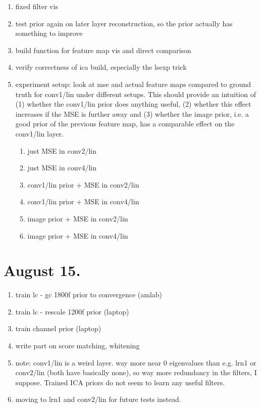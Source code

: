 \documentclass{article}
\begin{document}
\begin{enumerate}
	\item fixed filter vis
	\item test prior again on later layer reconstruction, so the prior actually has something to improve
	\item build function for feature map vis and direct comparison
	\item verify correctness of ica build, especially the lsexp trick
	\item experiment setup: look at mse and actual feature maps compared to ground truth for conv1/lin under different setups.
	This should provide an intuition of (1) whether the conv1/lin prior does anything useful, (2) whether this effect increases if the MSE is further away and (3) whether the image prior, i.e. a good prior of the previous feature map, has a comparable effect on the conv1/lin layer.
	\begin{enumerate}
		\item just MSE in conv2/lin
		\item just MSE in conv4/lin
		\item conv1/lin prior + MSE in conv2/lin
		\item conv1/lin prior + MSE in conv4/lin
		\item image prior + MSE in conv2/lin
		\item image prior + MSE in conv4/lin		
	\end{enumerate}
	
\end{enumerate}


\section{August 15.}

\begin{enumerate}
	\item train lc - gc 1800f prior to convergence (amlab)
	\item train lc - rescale 1200f prior (laptop)
	\item train channel prior (laptop)
	\item write part on score matching, whitening
	\item note: conv1/lin is a weird layer. way more near 0 eigenvalues than e.g. lrn1 or conv2/lin (both have basically none), so way more redundancy in the filters, I suppose. Trained ICA priors do not seem to learn any useful filters.
	\item moving to lrn1 and conv2/lin for future tests instead.
\end{enumerate}
\end{document}
